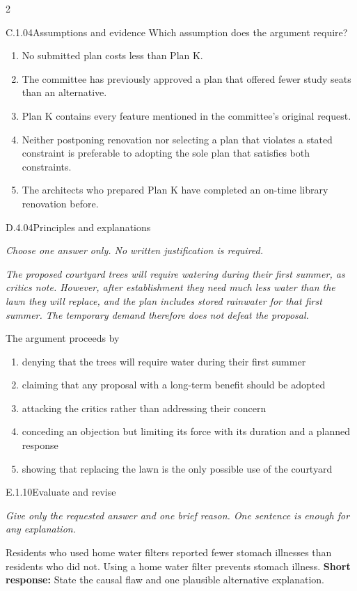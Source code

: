 \documentclass[9pt]{extarticle}
\newcommand{\choice}[1]{\item #1}
\begin{document}
\begin{multicols}{2}
\begin{DenseCoreProblem}{C.1.04}{Assumptions and evidence}
Which assumption does the argument require?
\begin{enumerate}[label=(\alph*)]
  \choice{No submitted plan costs less than Plan K.}
  \choice{The committee has previously approved a plan that offered fewer study seats than an alternative.}
  \choice{Plan K contains every feature mentioned in the committee's original request.}
  \choice{Neither postponing renovation nor selecting a plan that violates a stated constraint is preferable to adopting the sole plan that satisfies both constraints.}
  \choice{The architects who prepared Plan K have completed an on-time library renovation before.}
\end{enumerate}
\end{DenseCoreProblem}
\begin{DenseCoreProblem}{D.4.04}{Principles and explanations}
{\scriptsize\textit{Choose one answer only. No written justification is required.}\par}
\emph{The proposed courtyard trees will require watering during their first summer, as critics note. However, after establishment they need much less water than the lawn they will replace, and the plan includes stored rainwater for that first summer. The temporary demand therefore does not defeat the proposal.}

The argument proceeds by
\begin{enumerate}[label=(\alph*)]
  \choice{denying that the trees will require water during their first summer}
  \choice{claiming that any proposal with a long-term benefit should be adopted}
  \choice{attacking the critics rather than addressing their concern}
  \choice{conceding an objection but limiting its force with its duration and a planned response}
  \choice{showing that replacing the lawn is the only possible use of the courtyard}
\end{enumerate}
\end{DenseCoreProblem}
\begin{DenseCoreProblem}{E.1.10}{Evaluate and revise}
{\scriptsize\textit{Give only the requested answer and one brief reason. One sentence is enough for any explanation.}\par}
Residents who used home water filters reported fewer stomach illnesses than residents who did not. Using a home water filter prevents stomach illness.
\textbf{Short response:} State the causal flaw and one plausible alternative explanation.
\end{DenseCoreProblem}
\end{multicols}
\CoreWorkArea
\end{document}
